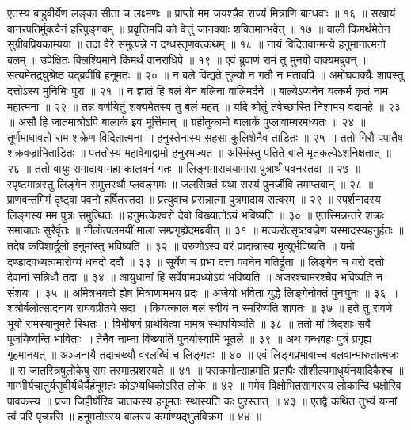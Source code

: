 एतस्य बाहुवीर्येण लङ्का सीता च लक्ष्मणः ॥
प्राप्तो मम जयश्चैव राज्यं मित्राणि बान्धवाः ॥ १६ ॥
सखायं वानरपतिर्मुक्त्वैनं हरिपुङ्गवम् ॥
प्रवृत्तिमपि को वेत्तुं जानक्याः शक्तिमान्भवेत् ॥ १७ ॥
वाली किमर्थमेतेन सुग्रीवप्रियकाम्यया ॥
तदा वैरे समुत्पन्ने न दग्धस्तृणवत्कथम् ॥ १८ ॥
नायं विदितवान्मन्ये हनुमानात्मनो बलम् ॥
उपेक्षितः क्लिश्यिमाने किमर्थं वानराधिपे ॥ १९ ॥
एवं ब्रुवाणं रामं तु मुनयो वाक्यमब्रुवन् ॥
सत्यमेतद्रघुश्रेष्ठ यद्ब्रवीषि हनूमतः ॥ २० ॥
न बले विद्यते तुल्यो न गतौ न मतावपि ॥
अमोघवाक्यैः शापस्तु दत्तोऽस्य मुनिभिः पुरा ॥ २१ ॥
न ज्ञातं हि बलं येन बलिना वालिमर्दने ॥
बाल्येऽप्यनेन यत्कर्म कृतं नाम महात्मना ॥ २२ ॥
तन्न वर्णयितुं शक्यमेतस्य तु बलं महत् ॥
यदि श्रोतुं तवेच्छास्ति निशामय वदामहे ॥ २३ ॥
असौ हि जातमात्रोऽपि बालार्क इव मूर्त्तिमान् ॥
ग्रहीतुकामो बालार्कं पुप्लावाम्बरमध्यतः ॥ २४ ॥
तूर्णमाधावतो राम शक्रेण विदितात्मना ॥
हनुस्तेनास्य सहसा कुलिशेनैव ताडितः ॥ २५ ॥
ततो गिरौ पपातैष शक्रवज्राभिताडितः ॥
पततोस्य महावेगाद्वामो हनुरभज्यत ॥
अस्मिंस्तु पतिते बाले मृतकल्पेऽशनिक्षतात् ॥ २६ ॥
ततो वायुः समादाय महा कालवनं गतः ॥
लिङ्गमाराधयामास पुत्रार्थं पवनस्तदा ॥ २७ ॥
स्पृष्टमात्रस्तु लिङ्गेन समुत्तस्थौ प्लवङ्गमः ॥
जलसिक्तं यथा सस्यं पुनर्जीवि तमाप्तवान् ॥ २८ ॥
प्राणवन्तमिमं दृष्ट्वा पवनो हर्षितस्तदा ॥
प्रत्युवाच प्रसन्नात्मा पुत्रमादाय सत्वरम् ॥ २९ ॥
स्पर्शनादस्य लिङ्गस्य मम पुत्रः समुत्थितः ॥
हनुमत्केश्वरो देवो विख्यातोऽयं भविष्यति ॥ ३० ॥
एतस्मिन्नन्तरे शक्रः समायातः सुरैर्वृतः ॥
नीलोत्पलमयीं मालां सम्प्रगृह्येदमब्रवीत् ॥ ३१ ॥
मत्करोत्सृष्टवज्रेण यस्मादस्यहनुर्हतः ॥
तदेष कपिशार्दूलो हनुमांस्तु भविष्यति ॥ ३२ ॥
वरुणोऽस्व वरं प्रादान्नास्य मृत्युर्भविष्यति ॥
यमो दण्डादवध्यत्वमारोग्यं धनदो ददौ ॥ ३३ ॥
सूर्येण च प्रभा दत्ता पवनेन गतिर्द्रुता ॥
लिङ्गेन च वरो दत्तो देवानां सन्निधौ तदा ॥ ३४ ॥
आयुधानां हि सर्वेषामवध्योऽयं भविष्यति ॥
अजरश्चामरश्चैव भविष्यति न संशयः ॥ ३५ ॥
अमित्रभयदो ह्येष मित्राणामभय प्रदः ॥
अजेयो भविता युद्धे लिङ्गेनोक्तं पुनःपुनः ॥ ३६ ॥
शत्रोर्बलोत्सादनाय राघवप्रीतये सदा ॥
कियत्कालं बलं स्वीयं न स्मरिष्यति शापतः ॥ ३७ ॥
हते तु रावणे भूयो रामस्यानुमते स्थितः ॥
विभीषणं प्रार्थयित्वा मामत्र स्थापयिष्यति ॥ ३८ ॥
ततो मां त्रिदशाः सर्वे पूजयिष्यन्ति भाविताः ॥
तेनैव नाम्ना विख्यातिं पुनर्यास्यामि भूतले ॥ ३९ ॥
अथ गन्धवहः पुत्रं प्रगृह्य गृहमानयत् ॥
अञ्जनायै तदाचख्यौ वरलब्धिं च लिङ्गतः ॥ ४० ॥
एवं लिङ्गप्रभावाच्च बलवान्मारुतात्मजः ॥
स जातस्त्रिषुलोकेषु राम तस्मात्प्रशस्यते ॥ ४१ ॥
पराक्रमोत्साहमति प्रतापैः सौशील्यमाधुर्यनयादिकैश्च ॥
गाम्भीर्यचातुर्यसुवीर्यधैर्यैर्हनूमतः कोऽभ्यधिकोऽस्ति लोके ॥ ४२ ॥
ममेव विक्षोभितसागरस्य लोकान्दि धक्षोरिव पावकस्य ॥
प्रजा जिहीर्षोरिव चातकस्य हनूमतः स्थास्यति कः पुरस्तात् ॥ ४३ ॥
एतद्वै कथित तुभ्यं यन्मां त्वं परि पृच्छसि ॥
हनूमतोऽस्य बालस्य कर्माण्यद्भुतविक्रम ॥ ४४ ॥
